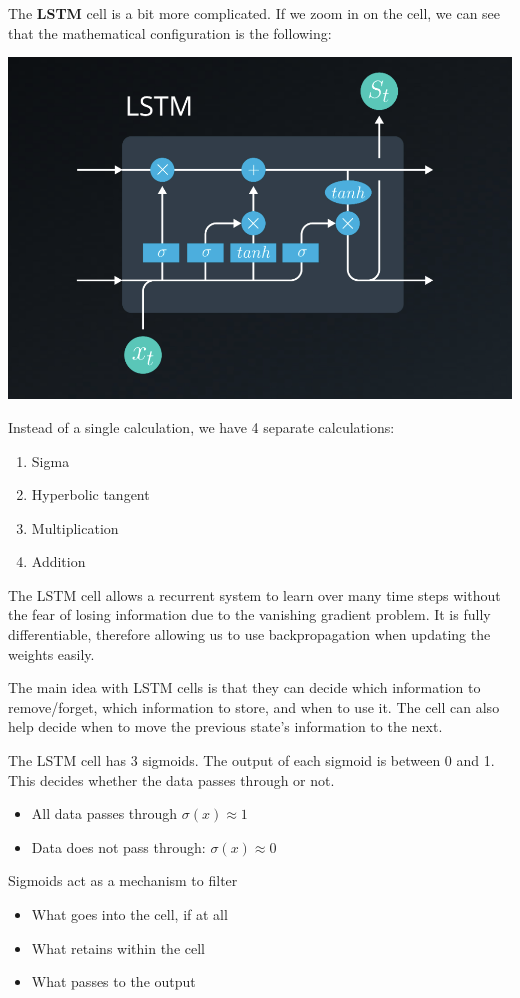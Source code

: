 The \textbf{LSTM} cell is a bit more complicated. If we zoom in on the cell, we can see that the mathematical configuration is the following:

\includegraphics[width=0.5\linewidth]{img//rnn//lstm/screen-shot-2017-11-27-at-3.44.20-pm.png}

Instead of a single calculation, we have 4 separate calculations:
\begin{enumerate}
    \item Sigma
    \item Hyperbolic tangent
    \item Multiplication
    \item Addition
\end{enumerate}

The LSTM cell allows a recurrent system to learn over many time steps without the fear of losing information due to the vanishing gradient problem. It is fully differentiable, therefore allowing us to use backpropagation when updating the weights easily. \newline

The main idea with LSTM cells is that they can decide which information to remove/forget, which information to store, and when to use it. The cell can also help decide when to move the previous state's information to the next. \newline

The LSTM cell has 3 sigmoids. The output of each sigmoid is between 0 and 1. This decides whether the data passes through or not.

\begin{itemize}
    \item All data passes through \(\sigma (x) \approx 1\)
    \item Data does not pass through: \(\sigma(x) \approx 0\)
\end{itemize}

Sigmoids act as a mechanism to filter
\begin{itemize}
    \item What goes into the cell, if at all
    \item What retains within the cell
    \item What passes to the output
\end{itemize}

